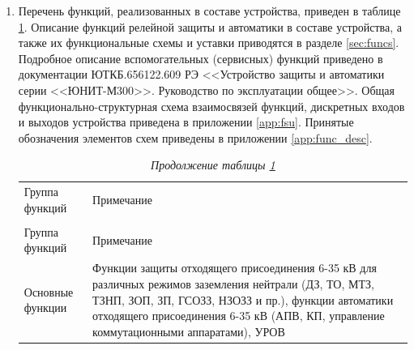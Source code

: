 \begin{enumerate}

\item
Перечень функций, реализованных в составе устройства, приведен в таблице \ref{desc:tbl1}. Описание функций релейной защиты и автоматики в составе устройства, а также их функциональные схемы и уставки приводятся в разделе \ref{sec:funcs}. Подробное описание вспомогательных (сервисных) функций приведено в документации ЮТКБ.656122.609 РЭ <<Устройство защиты и автоматики серии <<ЮНИТ-М300>>. Руководство по эксплуатации общее>>. Общая функционально-структурная схема взаимосвязей функций, дискретных входов и выходов устройства приведена в приложении \ref{app:fsu}. Принятые обозначения элементов схем приведены в приложении \ref{app:func_desc}.

\setlength{\extrarowheight}{0.05cm} %
\small
\begin{longtable}
{|>{\centering\arraybackslash}m{3.2cm}|>{\centering\arraybackslash}m{13.7cm}|}
\caption{Функции в составе устройства <<ЮНИТ-М300-ОЛ>>\hfill\vspace{-0.5\baselineskip}}\label{desc:tbl1}\\ 
\hhline{|-|-|}
\rowcolor{gray!30}
Группа функций & Примечание \\ 
\hhline{|-|-|}
\endfirsthead

\caption*{\hspace{3pt}\emph{Продолжение таблицы \ref{desc:tbl1}\hfill\vspace{-0.5\baselineskip}}} \\ %
\hhline{|-|-|}
\rowcolor{gray!30}
Группа функций & Примечание \\ 
\hhline{|-|-|}
\endhead
\hhline{|-|-|}

\endfoot
\endlastfoot

\centering Основные функции & \raggedright\arraybackslash Функции защиты отходящего присоединения 6-35 кВ для различных режимов заземления нейтрали (ДЗ, ТО, МТЗ, ТЗНП, ЗОП, ЗП, ГСОЗЗ, НЗОЗЗ и пр.), функции автоматики отходящего присоединения 6-35 кВ (АПВ, КП, управление коммутационными аппаратами), УРОВ  \\  \hline


\end{longtable}
\end{enumerate}
